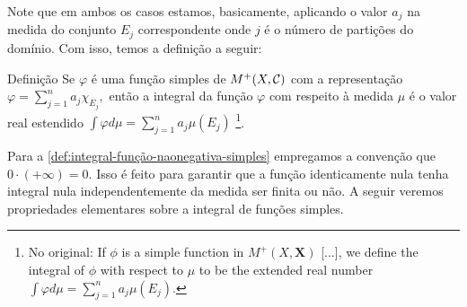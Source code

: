 Note que em ambos os casos estamos, basicamente, aplicando o valor $a_j$ na medida do conjunto $E_j$ correspondente onde $j$ é o número de partições do domínio. Com isso, temos a definição a seguir:
\begin{env}{Definição}
\label{def:integral-função-naonegativa-simples}
    Se $\varphi$ é uma função simples de $M^+(X, \operatorname{\mathcal{C}})$ com a representação 
    $\displaystyle\varphi =  \sum_{j = 1}^n a_j\chi_{E_j},$ então a integral da função $\varphi$ com respeito à medida $\mu$ é o valor real estendido
    \linebreak $
    \displaystyle\int\varphi d\mu = \sum_{j = 1}^n a_j\mu(E_j)
    $
    \cite[p.28, tradução nossa]{bartle}
    \footnote{No original: 
    	If $\phi$ is a simple function in $M^+(X, \textbf{X})$ [...], we define the integral of $\phi$ with respect to
    	$\mu$ to be the extended real number  
    	$
    	\displaystyle\int\varphi d\mu = \sum_{j = 1}^n a_j\mu(E_j)
    	$.
    }.
\end{env}

Para a \ref{def:integral-função-naonegativa-simples} empregamos a convenção que $0 \cdot (+\infty) = 0$.
Isso é feito para garantir que a função identicamente nula tenha integral nula independentemente da medida ser finita ou não.
A seguir veremos propriedades elementares sobre a integral de funções simples.

